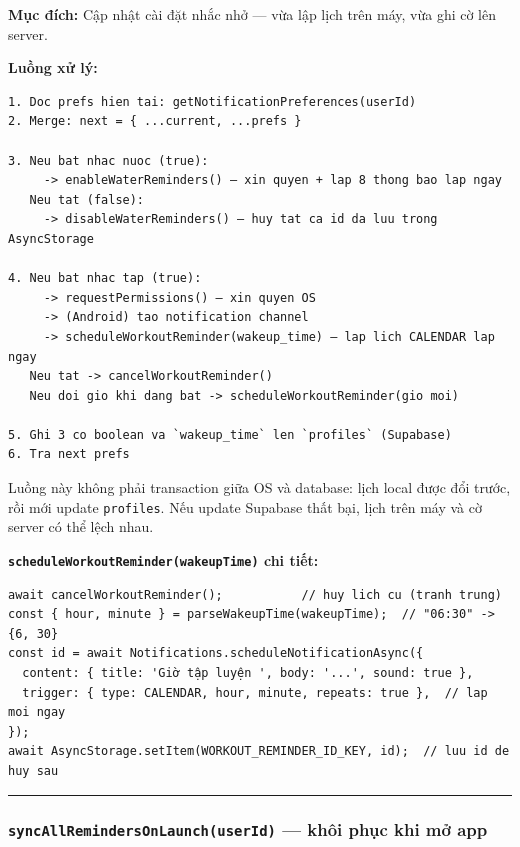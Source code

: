 \documentclass[12pt,a4paper]{article}
\begin{document}
\textbf{Mục đích:} Cập nhật cài đặt nhắc nhở --- vừa lập lịch trên máy,
vừa ghi cờ lên server.

\textbf{Luồng xử lý:}

\begin{verbatim}
1. Doc prefs hien tai: getNotificationPreferences(userId)
2. Merge: next = { ...current, ...prefs }

3. Neu bat nhac nuoc (true):
     -> enableWaterReminders() — xin quyen + lap 8 thong bao lap ngay
   Neu tat (false):
     -> disableWaterReminders() — huy tat ca id da luu trong AsyncStorage

4. Neu bat nhac tap (true):
     -> requestPermissions() — xin quyen OS
     -> (Android) tao notification channel
     -> scheduleWorkoutReminder(wakeup_time) — lap lich CALENDAR lap ngay
   Neu tat -> cancelWorkoutReminder()
   Neu doi gio khi dang bat -> scheduleWorkoutReminder(gio moi)

5. Ghi 3 co boolean va `wakeup_time` len `profiles` (Supabase)
6. Tra next prefs
\end{verbatim}

Luồng này không phải transaction giữa OS và database: lịch local được
đổi trước, rồi mới update \texttt{profiles}. Nếu update Supabase thất
bại, lịch trên máy và cờ server có thể lệch nhau.

\textbf{\texttt{scheduleWorkoutReminder(wakeupTime)} chi tiết:}

\begin{verbatim}
await cancelWorkoutReminder();           // huy lich cu (tranh trung)
const { hour, minute } = parseWakeupTime(wakeupTime);  // "06:30" -> {6, 30}
const id = await Notifications.scheduleNotificationAsync({
  content: { title: 'Giờ tập luyện ', body: '...', sound: true },
  trigger: { type: CALENDAR, hour, minute, repeats: true },  // lap moi ngay
});
await AsyncStorage.setItem(WORKOUT_REMINDER_ID_KEY, id);  // luu id de huy sau

\end{verbatim}

\begin{center}\rule{0.5\linewidth}{0.5pt}\end{center}

\subsubsection{\texorpdfstring{\texttt{syncAllRemindersOnLaunch(userId)}
--- khôi phục khi mở
app}{syncAllRemindersOnLaunch(userId) --- khôi phục khi mở app}}\label{syncallremindersonlaunchuserid-khuxf4i-phux1ee5c-khi-mux1edf-app}
\end{document}
